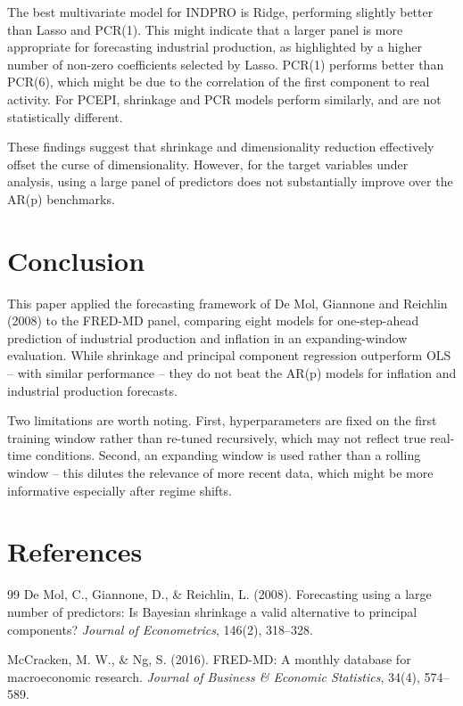 \documentclass[12pt, a4paper]{article}
\begin{document}
The best multivariate model for INDPRO is Ridge, performing slightly better than Lasso and PCR(1). This might indicate that a larger panel is more appropriate for forecasting industrial production, as highlighted by a higher number of non-zero coefficients selected by Lasso.
PCR(1) performs better than PCR(6), which might be due to the correlation of the first component to real activity.
For PCEPI, shrinkage and PCR models perform similarly, and are not statistically different.

These findings suggest that shrinkage and dimensionality reduction effectively offset the curse of dimensionality. However, for the target variables under analysis, using a large panel of predictors does not substantially improve over the AR(p) benchmarks.

\section{Conclusion}
\label{sec:conclusion and Limitations}

This paper applied the forecasting framework of De Mol, Giannone and Reichlin (2008) to the FRED-MD panel, comparing eight models for one-step-ahead prediction of industrial production and inflation in an expanding-window evaluation.
While shrinkage and principal component regression outperform OLS -- with similar performance -- they do not beat the AR(p) models for inflation and industrial production forecasts.

Two limitations are worth noting. First, hyperparameters are fixed on the first training window rather than re-tuned recursively, which may not reflect true real-time conditions.
Second, an expanding window is used rather than a rolling window -- this dilutes the relevance of more recent data, which might be more informative especially after regime shifts. 

\section{References}

\begin{thebibliography}{99}
    De Mol, C., Giannone, D., \& Reichlin, L. (2008).
    Forecasting using a large number of predictors: Is Bayesian shrinkage a valid alternative to principal components?
    \textit{Journal of Econometrics}, 146(2), 318--328.

    McCracken, M. W., \& Ng, S. (2016).
    FRED-MD: A monthly database for macroeconomic research.
    \textit{Journal of Business \& Economic Statistics}, 34(4), 574--589.
\end{thebibliography}

 
\end{document}

